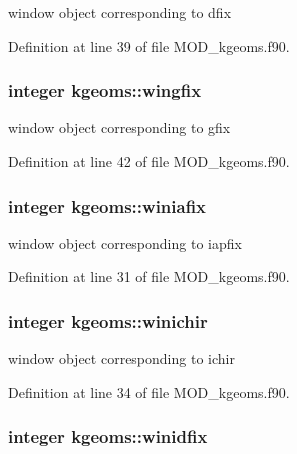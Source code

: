 window object corresponding to dfix 



Definition at line 39 of file M\-O\-D\-\_\-kgeoms.\-f90.

\hypertarget{classkgeoms_af323be093cbf37729b2880bc49379909}{
\subsubsection[{wingfix}]{\setlength{\rightskip}{0pt plus 5cm}integer kgeoms\-::wingfix}}\label{classkgeoms_af323be093cbf37729b2880bc49379909}


window object corresponding to gfix 



Definition at line 42 of file M\-O\-D\-\_\-kgeoms.\-f90.

\hypertarget{classkgeoms_adae1d3f57b925a5b1d9ef29dba13323e}{
\subsubsection[{winiafix}]{\setlength{\rightskip}{0pt plus 5cm}integer kgeoms\-::winiafix}}\label{classkgeoms_adae1d3f57b925a5b1d9ef29dba13323e}


window object corresponding to iapfix 



Definition at line 31 of file M\-O\-D\-\_\-kgeoms.\-f90.

\hypertarget{classkgeoms_a3bc7d77bc12ca32dd5e71a291460e29e}{
\subsubsection[{winichir}]{\setlength{\rightskip}{0pt plus 5cm}integer kgeoms\-::winichir}}\label{classkgeoms_a3bc7d77bc12ca32dd5e71a291460e29e}


window object corresponding to ichir 



Definition at line 34 of file M\-O\-D\-\_\-kgeoms.\-f90.

\hypertarget{classkgeoms_ac1977b191ae255c7987622fcf69f9fde}{
\subsubsection[{winidfix}]{\setlength{\rightskip}{0pt plus 5cm}integer kgeoms\-::winidfix}}\label{classkgeoms_ac1977b191ae255c7987622fcf69f9fde}



